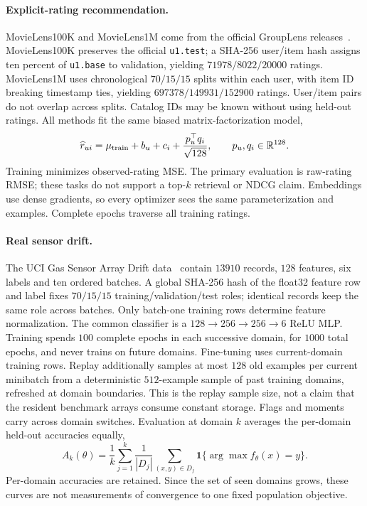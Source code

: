 \paragraph{Explicit-rating recommendation.}
MovieLens100K and MovieLens1M come from the official GroupLens releases~\citep{harper2015movielens}. MovieLens100K preserves the official \texttt{u1.test}; a SHA-256 user/item hash assigns ten percent of \texttt{u1.base} to validation, yielding $71978/8022/20000$ ratings. MovieLens1M uses chronological $70/15/15$ splits within each user, with item ID breaking timestamp ties, yielding $697378/149931/152900$ ratings. User/item pairs do not overlap across splits. Catalog IDs may be known without using held-out ratings. All methods fit the same biased matrix-factorization model,
\[
 \widehat r_{ui}=\mu_{\rm train}+b_u+c_i+
 \frac{p_u^\top q_i}{\sqrt{128}},\qquad p_u,q_i\in\mathbb R^{128}.
\]
Training minimizes observed-rating MSE. The primary evaluation is raw-rating RMSE; these tasks do not support a top-$k$ retrieval or NDCG claim. Embeddings use dense gradients, so every optimizer sees the same parameterization and examples. Complete epochs traverse all training ratings.

\paragraph{Real sensor drift.}
The UCI Gas Sensor Array Drift data~\citep{vergara2012gasdrift} contain $13910$ records, $128$ features, six labels and ten ordered batches. A global SHA-256 hash of the float32 feature row and label fixes $70/15/15$ training/validation/test roles; identical records keep the same role across batches. Only batch-one training rows determine feature normalization. The common classifier is a $128\to256\to256\to6$ ReLU MLP. Training spends $100$ complete epochs in each successive domain, for $1000$ total epochs, and never trains on future domains. Fine-tuning uses current-domain training rows. Replay additionally samples at most $128$ old examples per current minibatch from a deterministic $512$-example sample of past training domains, refreshed at domain boundaries. This is the replay sample size, not a claim that the resident benchmark arrays consume constant storage. Flags and moments carry across domain switches. Evaluation at domain $k$ averages the per-domain held-out accuracies equally,
\[
 A_k(\theta)=\frac1k\sum_{j=1}^k
 \frac1{|D_j|}\sum_{(x,y)\in D_j}
 \mathbf1\{\arg\max f_\theta(x)=y\}.
\]
Per-domain accuracies are retained. Since the set of seen domains grows, these curves are not measurements of convergence to one fixed population objective.

